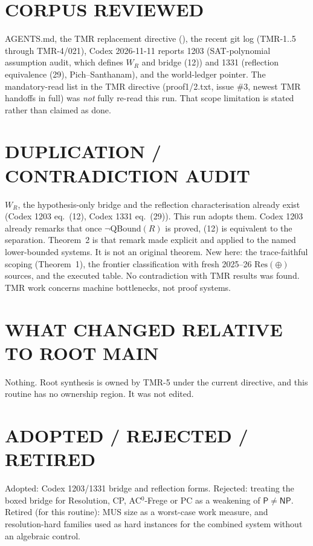 \documentclass[11pt]{article}
\begin{document}
\section*{CORPUS REVIEWED}
AGENTS.md, the TMR replacement directive
(),
the recent git log (TMR-1..5 through TMR-4/021), Codex 2026-11-11 reports
1203 (SAT-polynomial assumption audit, which defines $W_R$ and bridge (12)) and
1331 (reflection equivalence (29), Pich--Santhanam), and the world-ledger
pointer. The mandatory-read list in the TMR directive (proof1/2.txt, issue \#3,
newest TMR handoffs in full) was \emph{not} fully re-read this run. That scope
limitation is stated rather than claimed as done.

\section*{DUPLICATION / CONTRADICTION AUDIT}
$W_R$, the hypothesis-only bridge and the reflection characterisation already
exist (Codex 1203 eq.\ (12), Codex 1331 eq.\ (29)). This run adopts them.
Codex 1203 already remarks that once $\neg$QBound$(R)$ is proved, (12) is
equivalent to the separation. Theorem~2 is that remark made explicit and
applied to the named lower-bounded systems. It is not an original theorem. New
here: the trace-faithful scoping (Theorem~1), the frontier classification with
fresh 2025--26 $\mathrm{Res}(\oplus)$ sources, and the executed table.
No contradiction with TMR results was found. TMR work concerns machine
bottlenecks, not proof systems.

\section*{WHAT CHANGED RELATIVE TO ROOT MAIN}
Nothing. Root  synthesis is owned by TMR-5 under the current
directive, and this routine has no ownership region. It was not edited.

\section*{ADOPTED / REJECTED / RETIRED}
Adopted: Codex 1203/1331 bridge and reflection forms. Rejected: treating the
boxed bridge for Resolution, CP, AC$^0$-Frege or PC as a weakening of
$\mathsf P\neq\mathsf{NP}$. Retired (for this routine): MUS size as a
worst-case work measure, and resolution-hard families used as hard instances for
the combined system without an algebraic control.
\end{document}
